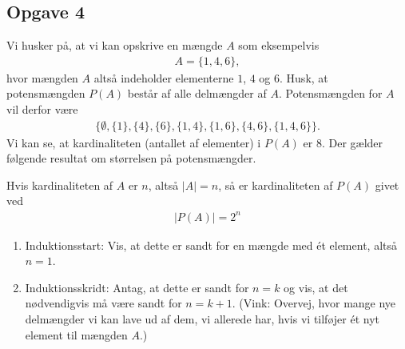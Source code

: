 \subsection*{Opgave 4}
Vi husker på, at vi kan opskrive en mængde $A$ som eksempelvis
\begin{align*}
	A = \{1,4,6\},
\end{align*}
hvor mængden $A$ altså indeholder elementerne $1$, $4$ og $6$. Husk, at potensmængden $P(A)$ består af
alle delmængder af $A$. Potensmængden for $A$ vil derfor være
\begin{align*}
	\{\emptyset,\{1\},\{4\},\{6\},\{1,4\},\{1,6\},\{4,6\},\{1,4,6\}\}.
\end{align*}
Vi kan se, at kardinaliteten (antallet af elementer) i $P(A)$ er 8.
Der gælder følgende resultat om størrelsen på potensmængder.
\begin{setn}[Potensmængder]
	Hvis kardinaliteten af $A$ er $n$, altså $|A| = n$, så er kardinaliteten af $P(A)$ givet ved
	\begin{align*}
		|P(A)| = 2^n
	\end{align*}
\end{setn}
\begin{enumerate}[label=\roman*)]
	\item Induktionsstart: Vis, at dette er sandt for en mængde med ét element, altså $n = 1$. 
	\item Induktionsskridt: Antag, at dette er sandt for $n = k$ og vis, at det nødvendigvis må være sandt for
	 $n = k+1$. (Vink: Overvej, hvor mange nye delmængder vi kan lave ud af dem, vi allerede har, hvis vi tilføjer
	 ét nyt element til mængden $A$.)
\end{enumerate}